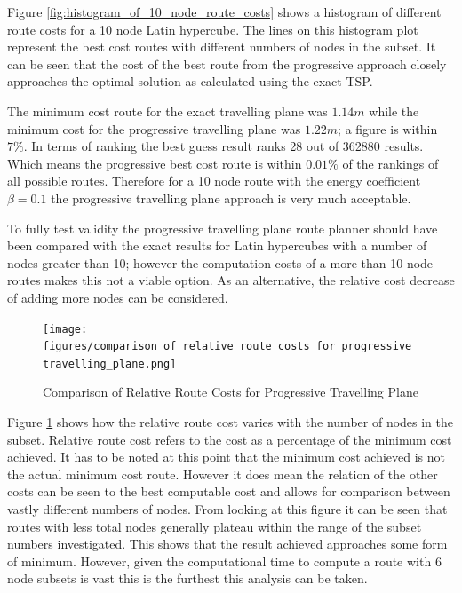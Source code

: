 \documentclass[a4paper,12pt,twoside]{article}
\begin{document}
Figure \ref{fig:histogram_of_10_node_route_costs} shows a histogram of different route costs for a 10 node Latin hypercube. The lines on this histogram plot represent the best cost routes with different numbers of nodes in the subset. It can be seen that the cost of the best route from the progressive approach closely approaches the optimal solution as calculated using the exact TSP.

The minimum cost route for the exact travelling plane was $1.14m$ while the minimum cost for the progressive travelling plane was $1.22m$; a figure is within $7\%$. In terms of ranking the best guess result ranks 28 out of 362880 results. Which means the progressive best cost route is within $0.01\%$ of the rankings of all possible routes. Therefore for a 10 node route with the energy coefficient $\beta=0.1$ the progressive travelling plane approach is very much acceptable.

To fully test validity the progressive travelling plane route planner should have been compared with the exact results for Latin hypercubes with a number of nodes greater than 10; however the computation costs of a more than 10 node routes makes this not a viable option. As an alternative, the relative cost decrease of adding more nodes can be considered.

\begin{figure}
\centering
\texttt{[image: figures/comparison\_of\_relative\_route\_costs\_for\_progressive\_travelling\_plane.png]} 
\caption{Comparison of Relative Route Costs for Progressive Travelling Plane}
\label{fig:comparison_of_relative_route_costs_for_progressive_travelling_plane}
\end{figure}

Figure \ref{fig:comparison_of_relative_route_costs_for_progressive_travelling_plane} shows how the relative route cost varies with the number of nodes in the subset. Relative route cost refers to the cost as a percentage of the minimum cost achieved. It has to be noted at this point that the minimum cost achieved is not the actual minimum cost route. However it does mean the relation of the other costs can be seen to the best computable cost and allows for comparison between vastly different numbers of nodes. From looking at this figure it can be seen that routes with less total nodes generally plateau within the range of the subset numbers investigated. This shows that the result achieved approaches some form of minimum. However, given the computational time to compute a route with 6 node subsets is vast this is the furthest this analysis can be taken.
\end{document}
